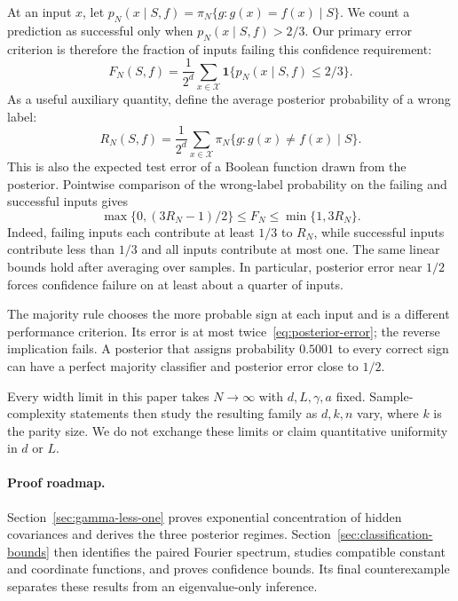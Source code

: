 \documentclass[11pt]{article}
\theoremstyle{remark}
\begin{document}
At an input $x$, let
$p_N(x\mid S,f)=\pi_N\{g:g(x)=f(x)\mid S\}$. We count a prediction as
successful only when $p_N(x\mid S,f)>2/3$. Our primary error criterion
is therefore the fraction of inputs failing this confidence requirement:
\begin{equation}\label{eq:confidence-error}
 F_N(S,f)=\frac1{2^d}\sum_{x\in\mathcal X}
                    \mathbf 1\{p_N(x\mid S,f)\le2/3\}.
\end{equation}
As a useful auxiliary quantity, define the average posterior
probability of a wrong label:
\begin{equation}\label{eq:posterior-error}
 R_N(S,f)=\frac1{2^d}\sum_{x\in\mathcal X}
            \pi_N\{g:g(x)\ne f(x)\mid S\}.
\end{equation}
This is also the expected test error of a Boolean function drawn from
the posterior. Pointwise comparison of the wrong-label probability
on the failing and successful inputs gives
\begin{equation}\label{eq:confidence-risk-comparison}
 \max\{0,(3R_N-1)/2\}\le F_N\le\min\{1,3R_N\}.
\end{equation}
Indeed, failing inputs each contribute at least $1/3$ to $R_N$,
while successful inputs contribute less than $1/3$ and all inputs
contribute at most one. The same linear bounds hold after averaging
over samples. In particular, posterior error near $1/2$ forces
confidence failure on at least about a quarter of inputs.

The majority rule chooses the more probable sign at
each input and is a different performance criterion. Its error is at
most twice~\eqref{eq:posterior-error}; the reverse implication fails.
A posterior that assigns probability $0.5001$ to every correct sign
can have a perfect majority classifier and posterior error close to
$1/2$.

Every width limit in this paper takes $N\to\infty$ with $d,L,\gamma,a$
fixed. Sample-complexity statements then study the resulting family
as $d,k,n$ vary, where $k$ is the parity size. We do not exchange these
limits or claim quantitative uniformity in $d$ or $L$.

\paragraph{Proof roadmap.}
Section~\ref{sec:gamma-less-one} proves exponential concentration of hidden
covariances and derives the three posterior regimes. Section~\ref{sec:classification-bounds}
then identifies the paired Fourier spectrum, studies compatible constant
and coordinate functions, and proves confidence bounds. Its final
counterexample separates these results from an eigenvalue-only inference.
\end{document}

